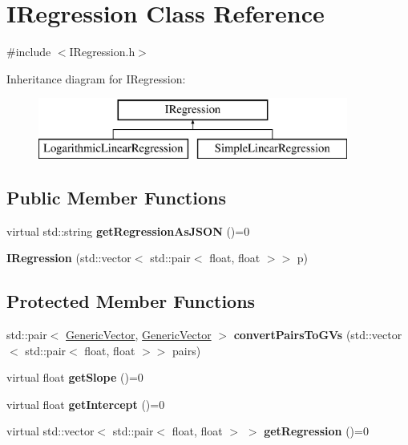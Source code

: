 \hypertarget{classIRegression}{}\section{I\+Regression Class Reference}
\label{classIRegression}


{\ttfamily \#include $<$I\+Regression.\+h$>$}

Inheritance diagram for I\+Regression\+:\begin{figure}[H]
\begin{center}
\leavevmode
\includegraphics[height=2.000000cm]{classIRegression}
\end{center}
\end{figure}
\subsection*{Public Member Functions}
\begin{DoxyCompactItemize}
\item 
\mbox{\label{classIRegression_ae8f41b89c9d8547d1d03749ac9ba9f4b}} 
virtual std\+::string {\bfseries get\+Regression\+As\+J\+S\+ON} ()=0
\item 
\mbox{\label{classIRegression_a96ea1a25100c62c8fff0b6c8c134946c}} 
{\bfseries I\+Regression} (std\+::vector$<$ std\+::pair$<$ float, float $>$$>$ p)
\end{DoxyCompactItemize}
\subsection*{Protected Member Functions}
\begin{DoxyCompactItemize}
\item 
\mbox{\label{classIRegression_a98c5a0c7bc09079c42239f9b765a9c88}} 
std\+::pair$<$ \hyperlink{classGenericVector}{Generic\+Vector}, \hyperlink{classGenericVector}{Generic\+Vector} $>$ {\bfseries convert\+Pairs\+To\+G\+Vs} (std\+::vector$<$ std\+::pair$<$ float, float $>$$>$ pairs)
\item 
\mbox{\label{classIRegression_a8790d7641b1ade722715e5d8bf473344}} 
virtual float {\bfseries get\+Slope} ()=0
\item 
\mbox{\label{classIRegression_a5a1a2500a739b98435563e5115576228}} 
virtual float {\bfseries get\+Intercept} ()=0
\item 
\mbox{\label{classIRegression_af62863f66e768a0bb482000862b16164}} 
virtual std\+::vector$<$ std\+::pair$<$ float, float $>$ $>$ {\bfseries get\+Regression} ()=0
\end{DoxyCompactItemize}
